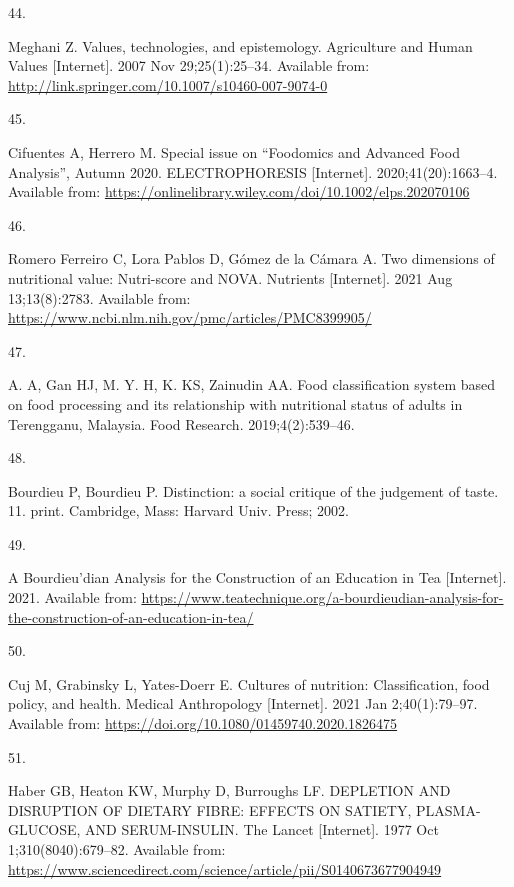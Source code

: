 \documentclass[
]{article}
\newlength{\cslhangindent}
\newlength{\csllabelwidth}
\newlength{\cslentryspacingunit} %
\newenvironment{CSLReferences}[2] %
 {%
  \setlength{\parindent}{0pt}
  \ifodd #1
  \let\oldpar\par
  \def\par{\hangindent=\cslhangindent\oldpar}
  \fi
  \setlength{\parskip}{#2\cslentryspacingunit}
 }%
 {}
\newcommand{\CSLLeftMargin}[1]{\parbox[t]{\csllabelwidth}{#1}}
\newcommand{\CSLRightInline}[1]{\parbox[t]{\linewidth - \csllabelwidth}{#1}\break}
\begin{document}
\begin{CSLReferences}{0}{0}
\leavevmode{}%
\CSLLeftMargin{44. }%
\CSLRightInline{Meghani Z. Values, technologies, and epistemology.
Agriculture and Human Values {[}Internet{]}. 2007 Nov 29;25(1):25--34.
Available from:
\url{http://link.springer.com/10.1007/s10460-007-9074-0}}

\leavevmode{}%
\CSLLeftMargin{45. }%
\CSLRightInline{Cifuentes A, Herrero M. Special issue on {``}Foodomics
and Advanced Food Analysis{''}, Autumn 2020. ELECTROPHORESIS
{[}Internet{]}. 2020;41(20):1663--4. Available from:
\url{https://onlinelibrary.wiley.com/doi/10.1002/elps.202070106}}

\leavevmode{}%
\CSLLeftMargin{46. }%
\CSLRightInline{Romero Ferreiro C, Lora Pablos D, Gómez de la Cámara A.
Two dimensions of nutritional value: Nutri-score and NOVA. Nutrients
{[}Internet{]}. 2021 Aug 13;13(8):2783. Available from:
\url{https://www.ncbi.nlm.nih.gov/pmc/articles/PMC8399905/}}

\leavevmode{}%
\CSLLeftMargin{47. }%
\CSLRightInline{A. A, Gan HJ, M. Y. H, K. KS, Zainudin AA. Food
classification system based on food processing and its relationship with
nutritional status of adults in Terengganu, Malaysia. Food Research.
2019;4(2):539--46. }

\leavevmode{}%
\CSLLeftMargin{48. }%
\CSLRightInline{Bourdieu P, Bourdieu P. Distinction: a social critique
of the judgement of taste. 11. print. Cambridge, Mass: Harvard Univ.
Press; 2002. }

\leavevmode{}%
\CSLLeftMargin{49. }%
\CSLRightInline{A Bourdieu{'}dian Analysis for the Construction of an
Education in Tea {[}Internet{]}. 2021. Available from:
\url{https://www.teatechnique.org/a-bourdieudian-analysis-for-the-construction-of-an-education-in-tea/}}

\leavevmode{}%
\CSLLeftMargin{50. }%
\CSLRightInline{Cuj M, Grabinsky L, Yates-Doerr E. Cultures of
nutrition: Classification, food policy, and health. Medical Anthropology
{[}Internet{]}. 2021 Jan 2;40(1):79--97. Available from:
\url{https://doi.org/10.1080/01459740.2020.1826475}}

\leavevmode{}%
\CSLLeftMargin{51. }%
\CSLRightInline{Haber GB, Heaton KW, Murphy D, Burroughs LF. DEPLETION
AND DISRUPTION OF DIETARY FIBRE: EFFECTS ON SATIETY, PLASMA-GLUCOSE, AND
SERUM-INSULIN. The Lancet {[}Internet{]}. 1977 Oct 1;310(8040):679--82.
Available from:
\url{https://www.sciencedirect.com/science/article/pii/S0140673677904949}}


\end{CSLReferences}
\end{document}
